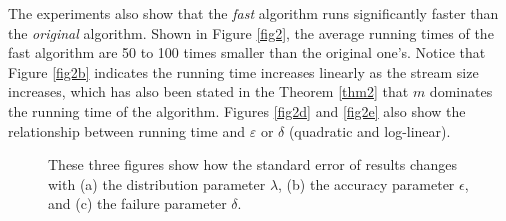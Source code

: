 \documentclass{scrartcl}
\begin{document}
The experiments also show that the \emph{fast} algorithm runs significantly faster than the \emph{original} algorithm. Shown in Figure \ref{fig2}, the average running times of the fast algorithm are 50 to 100 times smaller than the original one's. Notice that Figure \ref{fig2b} indicates the running time increases linearly as the stream size increases, which has also been stated in the Theorem \ref{thm2} that $m$ dominates the running time of the algorithm. Figures \ref{fig2d} and \ref{fig2e} also show the relationship between running time and $\varepsilon$ or $\delta$ (quadratic and log-linear).

\begin{figure}[pt]
\centering
{}
\caption{These three figures show how the standard error of results changes with (a) the distribution parameter $\lambda$, (b) the accuracy parameter $\epsilon$, and (c) the failure parameter $\delta$.}
\label{fig1}
\end{figure}
\end{document}
